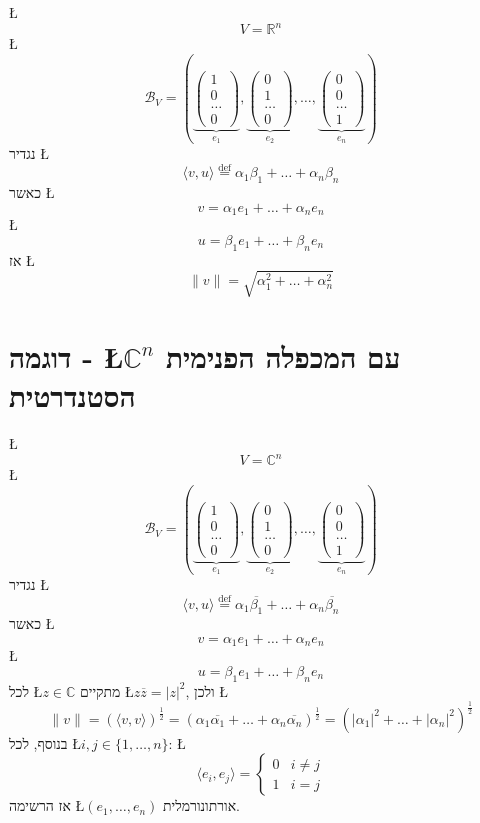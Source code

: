 \documentclass[english,hebrew]{article}
\begin{document}
\L{%
\[
V=\mathbb{R}^{n}
\]
}%
\L{%
\[
\mathcal{B}_{V}=\left(\underset{e_{1}}{\underbrace{\begin{pmatrix}1\\
0\\
\dots\\
0
\end{pmatrix}}},\underset{e_{2}}{\underbrace{\begin{pmatrix}0\\
1\\
\dots\\
0
\end{pmatrix}}},\dots,\underset{e_{n}}{\underbrace{\begin{pmatrix}0\\
0\\
\dots\\
1
\end{pmatrix}}}\right)
\]
}%
נגדיר \L{%
\[
\langle v,u\rangle\overset{\text{def}}{=}\alpha_{1}\beta_{1}+\dots+\alpha_{n}\beta_{n}
\]
}%
כאשר \L{%
\[
v=\alpha_{1}e_{1}+\dots+\alpha_{n}e_{n}
\]
}%
\L{%
\[
u=\beta_{1}e_{1}+\dots+\beta_{n}e_{n}
\]
}%
אז \L{%
\[
\|v\|=\sqrt{\alpha_{1}^{2}+\dots+\alpha_{n}^{2}}
\]
}%

\section{דוגמה - \L{$\mathbb{C}^{n}$} עם המכפלה הפנימית הסטנדרטית}

\L{%
\[
V=\mathbb{C}^{n}
\]
}%
\L{%
\[
\mathcal{B}_{V}=\left(\underset{e_{1}}{\underbrace{\begin{pmatrix}1\\
0\\
\dots\\
0
\end{pmatrix}}},\underset{e_{2}}{\underbrace{\begin{pmatrix}0\\
1\\
\dots\\
0
\end{pmatrix}}},\dots,\underset{e_{n}}{\underbrace{\begin{pmatrix}0\\
0\\
\dots\\
1
\end{pmatrix}}}\right)
\]
}%
נגדיר \L{%
\[
\langle v,u\rangle\overset{\text{def}}{=}\alpha_{1}\overline{\beta_{1}}+\dots+\alpha_{n}\overline{\beta_{n}}
\]
}%
כאשר \L{%
\[
v=\alpha_{1}e_{1}+\dots+\alpha_{n}e_{n}
\]
}%
\L{%
\[
u=\beta_{1}e_{1}+\dots+\beta_{n}e_{n}
\]
}%
לכל \L{$z\in\mathbb{C}$} מתקיים \L{$z\overline{z}=|z|^{2}$}, ולכן
\L{%
\[
\|v\|=\left(\langle v,v\rangle\right)^{\frac{1}{2}}=\left(\alpha_{1}\overline{\alpha_{1}}+\dots+\alpha_{n}\overline{\alpha_{n}}\right)^{\frac{1}{2}}=\left(|\alpha_{1}|^{2}+\dots+|\alpha_{n}|^{2}\right)^{\frac{1}{2}}
\]
}%
בנוסף, לכל \L{$i,j\in\{1,\dots,n\}$}: \L{%
\[
\langle e_{i},e_{j}\rangle=\begin{cases}
0 & i\neq j\\
1 & i=j
\end{cases}
\]
}%
אז הרשימה \L{$(e_{1},\dots,e_{n})$} אורתונורמלית.
\end{document}
